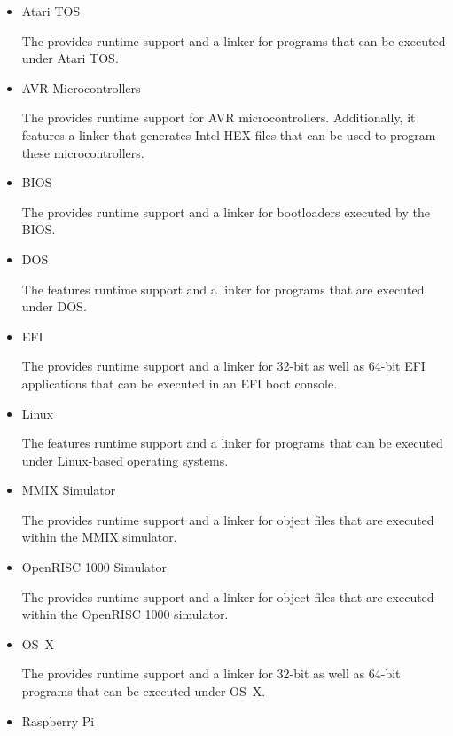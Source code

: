 \begin{itemize}

\item Atari TOS\nopagebreak

The \ecs{} provides runtime support and a linker for programs that can be executed under Atari TOS\@.

\item AVR Microcontrollers\nopagebreak

The \ecs{} provides runtime support for AVR microcontrollers.
Additionally, it features a linker that generates Intel HEX files that can be used to program these microcontrollers.

\item BIOS\nopagebreak

The \ecs{} provides runtime support and a linker for bootloaders executed by the BIOS\@.

\item DOS\nopagebreak

The \ecs{} features runtime support and a linker for programs that are executed under DOS\@.

\item EFI\nopagebreak

The \ecs{} provides runtime support and a linker for 32-bit as well as 64-bit EFI applications that can be executed in an EFI boot console.

\item Linux\nopagebreak

The \ecs{} features runtime support and a linker for programs that can be executed under Linux-based operating systems.

\item MMIX Simulator\nopagebreak

The \ecs{} provides runtime support and a linker for object files that are executed within the MMIX simulator.

\item OpenRISC 1000 Simulator\nopagebreak

The \ecs{} provides runtime support and a linker for object files that are executed within the OpenRISC 1000 simulator.

\item OS~X\nopagebreak

The \ecs{} provides runtime support and a linker for 32-bit as well as 64-bit programs that can be executed under OS~X\@.

\item Raspberry Pi\nopagebreak


\end{itemize}
